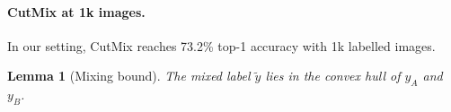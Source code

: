 \documentclass[11pt]{article}
\theoremstyle{plain}
\newtheorem{lemma}[theorem]{Lemma}
\theoremstyle{definition}
\begin{document}
\paragraph{CutMix at 1k images.}
In our setting, CutMix reaches 73.2\% top-1 accuracy with 1k labelled images. %

\begin{lemma}[Mixing bound]\label{lem:mixing-bound}
The mixed label $\tilde{y}$ lies in the convex hull of $y_A$ and $y_B$.
\end{lemma}



\end{document}
